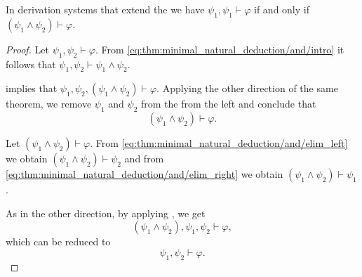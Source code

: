 \begin{proposition}\label{thm:formulas_are_derivable_iff_conjunction_is_derivable}
  In derivation systems that extend the  we have \( \psi_1, \psi_1 \vdash \varphi \) if and only if \( (\psi_1 \wedge \psi_2) \vdash \varphi \).
\end{proposition}
\begin{proof}
  \SufficiencySubProof Let \( \psi_1, \psi_2 \vdash \varphi \). From \eqref{eq:thm:minimal_natural_deduction/and/intro} it follows that \( \psi_1, \psi_2 \vdash \psi_1 \wedge \psi_2 \).

   implies that \( \psi_1, \psi_2, (\psi_1 \wedge \psi_2) \vdash \varphi \). Applying the other direction of the same theorem, we remove \( \psi_1 \) and \( \psi_2 \) from the from the left and conclude that
  \begin{equation*}
    (\psi_1 \wedge \psi_2) \vdash \varphi.
  \end{equation*}

  \NecessitySubProof Let \( (\psi_1 \wedge \psi_2) \vdash \varphi \). From \eqref{eq:thm:minimal_natural_deduction/and/elim_left} we obtain \( (\psi_1 \wedge \psi_2) \vdash \psi_2 \) and from \eqref{eq:thm:minimal_natural_deduction/and/elim_right} we obtain \( (\psi_1 \wedge \psi_2) \vdash \psi_1 \).

  As in the other direction, by applying , we get
  \begin{equation*}
    (\psi_1 \wedge \psi_2), \psi_1, \psi_2 \vdash \varphi,
  \end{equation*}
  which can be reduced to
  \begin{equation*}
    \psi_1, \psi_2 \vdash \varphi.
  \end{equation*}
\end{proof}

